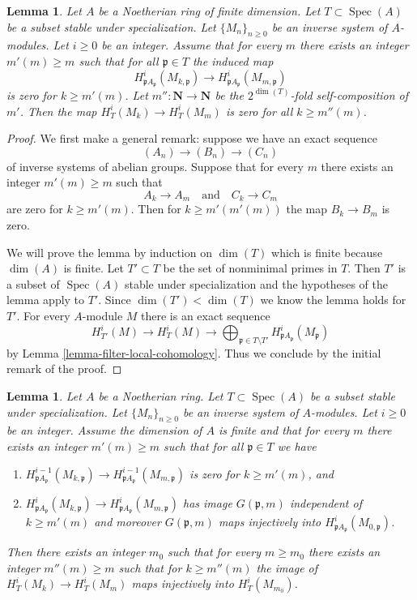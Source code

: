 \documentclass{stacks-project}
\theoremstyle{plain}
\newtheorem{lemma}[subsection]{Lemma}
\theoremstyle{definition}
\theoremstyle{remark}
\numberwithin{equation}{subsection}
\def\Spec{\mathop{\mathrm{Spec}}}
\begin{document}
\begin{lemma}
\label{lemma-zero}
Let $A$ be a Noetherian ring of finite dimension.
Let $T \subset \Spec(A)$ be a subset stable under specialization.
Let $\{M_n\}_{n \geq 0}$ be an inverse system of $A$-modules.
Let $i \geq 0$ be an integer. Assume that for every $m$ there
exists an integer $m'(m) \geq m$ such  that for all
$\mathfrak p \in T$ the induced map
$$
H^i_{\mathfrak p A_\mathfrak p}(M_{k, \mathfrak p})
\longrightarrow
H^i_{\mathfrak p A_\mathfrak p}(M_{m, \mathfrak p})
$$
is zero for $k \geq m'(m)$. Let $m'' : \mathbf{N} \to \mathbf{N}$
be the $2^{\dim(T)}$-fold self-composition of $m'$. Then the map
$H^i_T(M_k) \to H^i_T(M_m)$ is zero for all $k \geq m''(m)$.
\end{lemma}

\begin{proof}
We first make a general remark: suppose we have an exact
sequence
$$
(A_n) \to (B_n) \to (C_n)
$$
of inverse systems of abelian groups. Suppose that for every
$m$ there exists an integer $m'(m) \geq m$ such that
$$
A_k \to A_m
\quad\text{and}\quad
C_k \to C_m
$$
are zero for $k \geq m'(m)$. Then for $k \geq m'(m'(m))$
the map $B_k \to B_m$ is zero.

\medskip\noindent
We will prove the lemma by induction on $\dim(T)$ which is
finite because $\dim(A)$ is finite. Let $T' \subset T$ be
the set of nonminimal primes in $T$. Then $T'$
is a subset of $\Spec(A)$ stable under specialization
and the hypotheses of the lemma apply to $T'$.
Since $\dim(T') < \dim(T)$ we know the lemma holds for $T'$.
For every $A$-module $M$ there is an exact sequence
$$
H^i_{T'}(M) \to H^i_T(M) \to
\bigoplus\nolimits_{\mathfrak p \in T \setminus T'}
H^i_{\mathfrak p A_\mathfrak p}(M_\mathfrak p)
$$
by Lemma \ref{lemma-filter-local-cohomology}.
Thus we conclude by the initial remark of the proof.
\end{proof}

\begin{lemma}
\label{lemma-essential-image}
Let $A$ be a Noetherian ring. Let $T \subset \Spec(A)$ be a subset
stable under specialization. Let $\{M_n\}_{n \geq 0}$ be an inverse system
of $A$-modules. Let $i \geq 0$ be an integer. Assume the dimension of $A$
is finite and that for every $m$ there exists an integer $m'(m) \geq m$
such that for all $\mathfrak p \in T$ we have
\begin{enumerate}
\item $H^{i - 1}_{\mathfrak p A_\mathfrak p}(M_{k, \mathfrak p})
\to H^{i - 1}_{\mathfrak p A_\mathfrak p}(M_{m, \mathfrak p})$
is zero for $k \geq m'(m)$, and
\item $ H^i_{\mathfrak p A_\mathfrak p}(M_{k, \mathfrak p}) \to
H^i_{\mathfrak p A_\mathfrak p}(M_{m, \mathfrak p})$
has image $G(\mathfrak p, m)$ independent of $k \geq m'(m)$ and moreover
$G(\mathfrak p, m)$ maps injectively into
$H^i_{\mathfrak p A_\mathfrak p}(M_{0, \mathfrak p})$.
\end{enumerate}
Then there exists an integer $m_0$ such that for every $m \geq m_0$
there exists an integer $m''(m) \geq m$ such that
for $k \geq m''(m)$ the image of $H^i_T(M_k) \to H^i_T(M_m)$
maps injectively into $H^i_T(M_{m_0})$.
\end{lemma}
\end{document}
